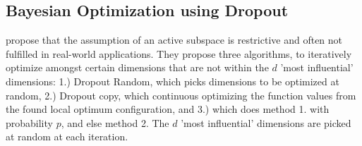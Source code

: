 \subsection{Bayesian Optimization using Dropout}
\citep{Li2018} propose that the assumption of an active subspace is restrictive and often not fulfilled in real-world applications.
They propose three algorithms, to iteratively optimize amongst certain dimensions that are not within the $d$ 'most influential' dimensions: 1.) Dropout Random, which picks dimensions to be optimized at random, 2.) Dropout copy, which continuous optimizing the function values from the found local optimum configuration, and 3.) which does method 1. with probability $p$, and else method 2.
The $d$ 'most influential' dimensions are picked at random at each iteration.
